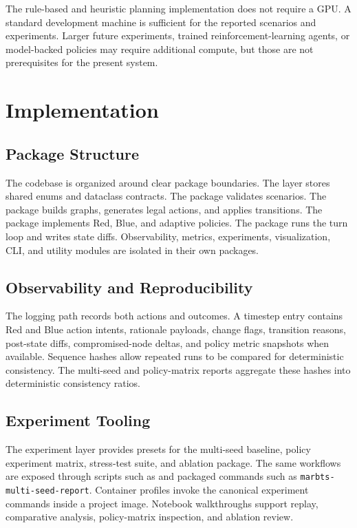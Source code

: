 \documentclass[conference]{IEEEtran}
\begin{document}
The rule-based and heuristic planning implementation does not require a GPU. A standard development machine is sufficient for the reported scenarios and experiments. Larger future experiments, trained reinforcement-learning agents, or model-backed policies may require additional compute, but those are not prerequisites for the present system.

\section{Implementation}
\subsection{Package Structure}
The codebase is organized around clear package boundaries. The  layer stores shared enums and dataclass contracts. The  package validates scenarios. The  package builds graphs, generates legal actions, and applies transitions. The  package implements Red, Blue, and adaptive policies. The  package runs the turn loop and writes state diffs. Observability, metrics, experiments, visualization, CLI, and utility modules are isolated in their own packages.

\subsection{Observability and Reproducibility}
The logging path records both actions and outcomes. A timestep entry contains Red and Blue action intents, rationale payloads, change flags, transition reasons, post-state diffs, compromised-node deltas, and policy metric snapshots when available. Sequence hashes allow repeated runs to be compared for deterministic consistency. The multi-seed and policy-matrix reports aggregate these hashes into deterministic consistency ratios.

\subsection{Experiment Tooling}
The experiment layer provides presets for the multi-seed baseline, policy experiment matrix, stress-test suite, and ablation package. The same workflows are exposed through scripts such as  and packaged commands such as \texttt{marbts-multi-seed-report}. Container profiles invoke the canonical experiment commands inside a project image. Notebook walkthroughs support replay, comparative analysis, policy-matrix inspection, and ablation review.
\end{document}
